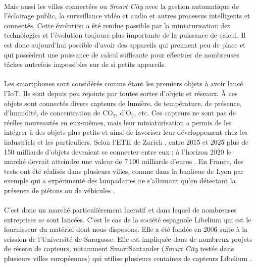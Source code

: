     \paragraph{}Mais aussi les villes connectées ou \emph{Smart City} avec la gestion automatique de l'éclairage public, la surveillance vidéo et audio et autres processus intelligents et connectés. Cette évolution a été rendue possible par la miniaturisation des technologies et l'évolution toujours plus importante de la puissance de calcul. Il est donc aujourd'hui possible d'avoir des appareils qui prennent peu de place et qui possèdent une puissance de calcul suffisante pour effectuer de nombreuses tâches autrefois impossibles sur de si petits appareils.

    \paragraph{}Les smartphones sont considérés comme étant les premiers objets à avoir lancé l'IoT. Ils sont depuis peu rejoints par toutes sortes d'objets et réseaux. À ces objets sont connectés divers capteurs de lumière, de température, de présence, d'humidité, de concentration de CO$_{2}$, d'O$_{2}$, etc. Ces capteurs ne sont pas de réelles nouveautés en eux-mêmes, mais leur miniaturisation a permis de les intégrer à des objets plus petits et ainsi de favoriser leur développement chez les industriels et les particuliers. Selon l'ETH de Zurich \cite{eth}, entre 2015 et 2025 plus de 150 milliards d'objets devraient se connecter entre eux ; à l'horizon 2020 le marché devrait atteindre une valeur de 7\,100 milliards d'euros \cite{marche}. En France, des tests ont été réalisés dans plusieurs villes, comme dans la banlieue de Lyon par exemple qui a expérimenté des lampadaires ne s'allumant qu'en détectant la présence de piétons ou de véhicules \cite{monde}. 

    \paragraph{}C'est donc un marché particulièrement lucratif et dans lequel de nombreuses entreprises se sont lancées. C'est le cas de la société espagnole Libelium qui est le fournisseur du matériel dont nous disposons. Elle a été fondée en 2006 suite à la scission de l'Université de Saragosse. Elle est impliquée dans de nombreux projets de réseau de capteurs, notamment SmartSantander (\emph{Smart City} testée dans plusieurs villes européennes) qui utilise plusieurs centaines de capteurs Libelium \cite{santander}.
